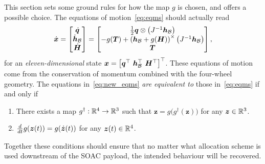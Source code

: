 \documentclass[10pt]{article}
\begin{document}
This section sets some ground rules for how the map $g$ is chosen, and offers a possible choice. The equations of motion~\eqref{eq:eqms} should actually read 
\begin{equation}
\dot{\bm{x}} = \begin{bmatrix}
\dot{\bm{q}} \\ \dot{\bm{h}}_{\mathcal{B}} \\ \dot{\bm{H}}
\end{bmatrix} = \begin{bmatrix}
\tfrac{1}{2} \bm{q} \otimes \left(J^{-1} \bm{h}_{\mathcal{B}} \right) \\
-g(\bm{T}) + \left( \bm{h}_{\mathcal{B}} + g(\bm{H}) \right)^{\times} \left( J^{-1} \bm{h}_{\mathcal{B}} \right) \\
\bm{T}
\end{bmatrix},
\label{eq:new_eqms}
\end{equation}
for an \textit{eleven-dimensional} state $\bm{x} = \left[ \q\tran \ \hB\tran \ \bm{H}\tran \right]\tran$. These equations of motion come from the conservation of momentum combined with the four-wheel geometry. The equations in~\eqref{eq:new_eqms} \textit{are equivalent to} those in~\eqref{eq:eqms} if and only if
\begin{enumerate}
\item There exists a map $g^{\dagger} : {\mathbb{R}}^4 \rightarrow {\mathbb{R}}^3$ such that $\bm{z} = g\big( g^{\dagger}(\bm{z})\big)$ for any $\bm{z}\in{\mathbb{R}}^3$. 
\item $\frac{d }{d t}g(\bm{z}(t)) = g(\dot{\bm{z}}(t))$ for any $\bm{z}(t)\in{\mathbb{R}}^4$.
\end{enumerate}
Together these conditions should ensure that no matter what allocation scheme is used downstream of the SOAC payload, the intended behaviour will be recovered. 
\end{document}
